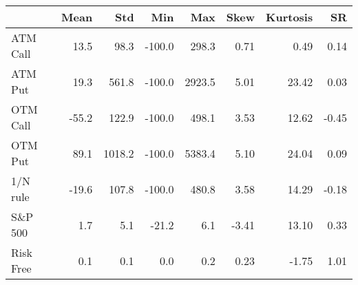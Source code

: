 \begin{tabular}{lrrrrrrr}
\hline
           &   Mean &    Std &    Min &    Max &   Skew &   Kurtosis &    SR \\
\hline
 ATM Call  &   13.5 &   98.3 & -100.0 &  298.3 &   0.71 &       0.49 &  0.14 \\
 ATM Put   &   19.3 &  561.8 & -100.0 & 2923.5 &   5.01 &      23.42 &  0.03 \\
 OTM Call  &  -55.2 &  122.9 & -100.0 &  498.1 &   3.53 &      12.62 & -0.45 \\
 OTM Put   &   89.1 & 1018.2 & -100.0 & 5383.4 &   5.10 &      24.04 &  0.09 \\
 1/N rule  &  -19.6 &  107.8 & -100.0 &  480.8 &   3.58 &      14.29 & -0.18 \\
 S\&P 500   &    1.7 &    5.1 &  -21.2 &    6.1 &  -3.41 &      13.10 &  0.33 \\
 Risk Free &    0.1 &    0.1 &    0.0 &    0.2 &   0.23 &      -1.75 &  1.01 \\
\hline
\end{tabular}